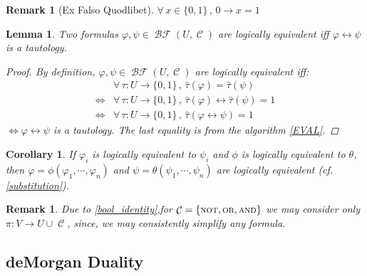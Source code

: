 \documentclass[12pt]{article}
\let\LR\Leftrightarrow
\newcommand{\Forall}[1]{\forall\,{#1}\,,\,}
\newcommand{\scr}[1]{{\scriptstyle\textup{#1}}}
\DeclareMathOperator{\C}{\mathcal{C}}
\DeclareMathOperator{\BF}{\mathcal{BF}}
\DeclareMathOperator{\NOT}{\scr{NOT}}
\DeclareMathOperator{\OR}{\scr{OR}}
\DeclareMathOperator{\AND}{\scr{AND}}
\newcommand*{\B}{\{0,1\}}
\newtheorem{lemma}[theorem]{Lemma}
\newtheorem{corollary}[theorem]{Corollary}
\newtheorem{remark}[theorem]{Remark}
\begin{document}
\begin{remark}[Ex Falso Quodlibet]
  $\Forall{x\in\B}0\to x=1$
\end{remark}

\begin{lemma}
  Two formulas $\varphi,\psi\in\BF(U,\C)$ are logically equivalent iff $\varphi\leftrightarrow\psi$ is a tautology.
  \begin{proof}
    By definition, $\varphi,\psi\in\BF(U,\C)$ are logically equivalent iff: \begin{align*}
      &\Forall{\tau:U\to\B}\hat{\tau}(\varphi)=\hat{\tau}(\psi)\\
      \LR&\Forall{\tau:U\to\B} \hat{\tau}(\varphi) \leftrightarrow \hat{\tau}(\psi)=1\\
      \LR&\Forall{\tau:U\to\B} \hat{\tau}(\varphi\leftrightarrow\psi)=1
    \end{align*} $\LR \varphi\leftrightarrow\psi$ is a tautology. The last equality is from the algorithm \ref{EVAL}.
  \end{proof}
\end{lemma}

\begin{corollary}
  If $\varphi_i$ is logically equivalent to $\psi_i$ and $\phi$ is logically equivalent to $\theta$, then $\varphi=\phi(\varphi_1,\cdots,\varphi_n)$ and $\psi=\theta(\psi_1,\cdots,\psi_n)$ are logically equivalent (cf. \ref{substitution}).
\end{corollary}

\begin{remark}
  \label{no_consts}
  Due to \ref{bool_identity},for $\C=\{\NOT,\OR,\AND\}$ we may consider only $\pi:V\to U\cup\C$, since, we may consistently simplify any formula.
\end{remark}

\pagebreak

\subsection{deMorgan Duality}
\end{document}

